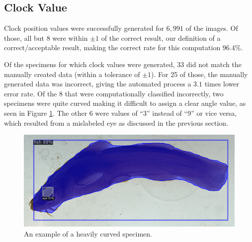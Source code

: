 \documentclass[conference]{IEEEtran}
\begin{document}
\subsection{Clock Value}
Clock position values were successfully generated for \(6,991\) of the images. Of those, all but 8 were within \(\pm{}1\) of the correct result,
our definition of a correct/acceptable result, making the correct rate for
this computation 96.4\%.

Of the specimens for which clock values were generated, 33 did not match the manually created data (within a tolerance of \(\pm{}1\)).
For 25 of those, the manually generated data was incorrect, giving the automated process a \(3.1\) times lower error rate. Of the 8 that were
computationally classified incorrectly,
two specimens were quite curved making it difficult to assign a clear angle value, as
seen in Figure \ref{fig:curvedFish}.
The other 6 were values of ``3'' instead of ``9'' or vice versa, which resulted from
a mislabeled eye as discussed in the previous section.

\begin{figure}[H]
  \centering
  \includegraphics[width=0.7\linewidth]{images/curved1}
  \caption{An example of a heavily curved specimen.}
  \label{fig:curvedFish}
\end{figure}

\end{document}
